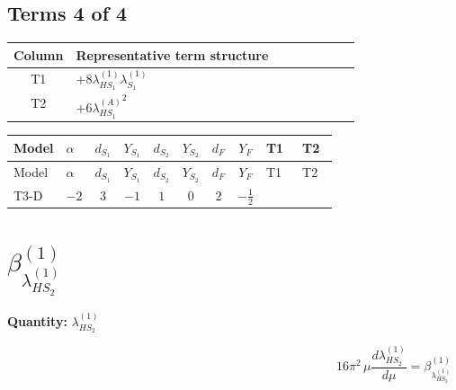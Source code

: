 \documentclass[8pt]{article}
\begin{document}
\begin{landscape}
\subsection*{Terms 4 of 4}
\begin{center}
\begin{tabular}{@{}c >{\raggedright\arraybackslash}p{0.82\linewidth}@{}}
\toprule
Column & Representative term structure \\
\midrule
T1 & \(\displaystyle +8 {\lambda_{HS_1}^{(1)}} {\lambda_{S_1}^{(1)}}\) \\
\midrule
T2 & \(\displaystyle +6 {\lambda_{HS_1}^{(A)}}^2\) \\
\midrule
\bottomrule
\end{tabular}
\end{center}
\smallskip
\tiny
\begin{longtable}{@{}llcccccc >{\raggedright\arraybackslash}p{0.21\linewidth} >{\raggedright\arraybackslash}p{0.21\linewidth}@{}}
\toprule
Model & $\alpha$ & $d_{S_1}$ & $Y_{S_1}$ & $d_{S_2}$ & $Y_{S_2}$ & $d_F$ & $Y_F$ & T1 & T2 \\
\midrule
\endfirsthead
\toprule
Model & $\alpha$ & $d_{S_1}$ & $Y_{S_1}$ & $d_{S_2}$ & $Y_{S_2}$ & $d_F$ & $Y_F$ & T1 & T2 \\
\midrule
\endhead
T3-D & $-2$ & $3$ & $-1$ & $1$ & $0$ & $2$ & $-\frac{1}{2}$ & \scriptsize\adjustbox{max width=\linewidth}{$\begin{gathered} +8 {\lambda_{HS_1}^{(1)}} {\lambda_{S_1}^{(1)}}\end{gathered}$} & \scriptsize\adjustbox{max width=\linewidth}{$\begin{gathered} +6 {\lambda_{HS_1}^{(A)}}^2\end{gathered}$} \\
\midrule
\bottomrule
\end{longtable}
\clearpage
\section*{$\beta_{\lambda_{HS_2}^{(1)}}^{(1)}$}
\noindent\textbf{Quantity: }$\lambda_{HS_2}^{(1)}$\par\smallskip
\[16\pi^2\,\mu\frac{d \lambda_{HS_2}^{(1)}}{d\mu}=\beta_{\lambda_{HS_2}^{(1)}}^{(1)}\]

\end{landscape}
\end{document}

